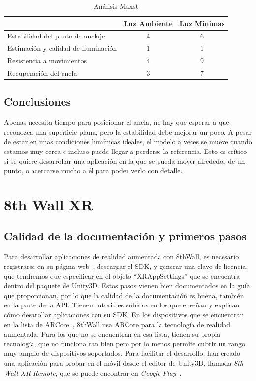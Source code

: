 \begin{table}[H]
    \centering
      \begin{tabular}{l c c}
    \toprule
          & Luz Ambiente & Luz Mínimas \\
         \midrule
        Estabilidad del punto de anclaje   &4 &6\\
        
        Estimación y calidad de iluminación  &1 &1 \\
        
        Resistencia a movimientos  &4 &9 \\
        
        Recuperación del ancla  &3 &7 \\
      \bottomrule
    \end{tabular}
    \caption{Análisis Maxst}
    \label{tab:TMaxst}
\end{table}
\subsection{Conclusiones}
Apenas necesita tiempo para posicionar el ancla, no hay que esperar a que reconozca una superficie plana, pero la estabilidad debe mejorar un poco. A pesar de estar en unas condiciones lumínicas ideales, el modelo a veces se mueve cuando estamos muy cerca e incluso puede llegar a perderse la referencia. Esto es crítico si se quiere desarrollar una aplicación en la que se pueda mover alrededor de un punto, o acercarse mucho a él para poder verlo con detalle. 



\section{8th Wall XR}
\subsection{Calidad de la documentación y primeros pasos}
Para desarrollar aplicaciones de realidad aumentada con 8thWall, es necesario registrarse en su página web~\cite{8thWall}, descargar el SDK, y generar una clave de licencia, que tendremos que especificar en el objeto ``XRAppSettings'' que se encuentra dentro del paquete de Unity3D. Estos pasos vienen bien documentados en la guía que proporcionan, por lo que la calidad de la documentación es buena, también en la parte de la API. Tienen tutoriales subidos en los que enseñan y explican cómo desarollar aplicaciones con su SDK. En los dispositivos que se encuentran en la lista de ARCore~\cite{ARCoreList}, 8thWall usa ARCore para la tecnología de realidad aumentada. Para los que no se encuentran en esa lista, tienen su propia tecnología, que no funciona tan bien pero por lo menos permite cubrir un rango muy amplio de dispositivos soportados. Para facilitar el desarrollo, han creado una aplicación para probar en el móvil desde el editor de Unity3D, llamada \textit{8th Wall XR Remote}, que se puede encontrar en \textit{Google Play}~\cite{8thWallRemote}.


